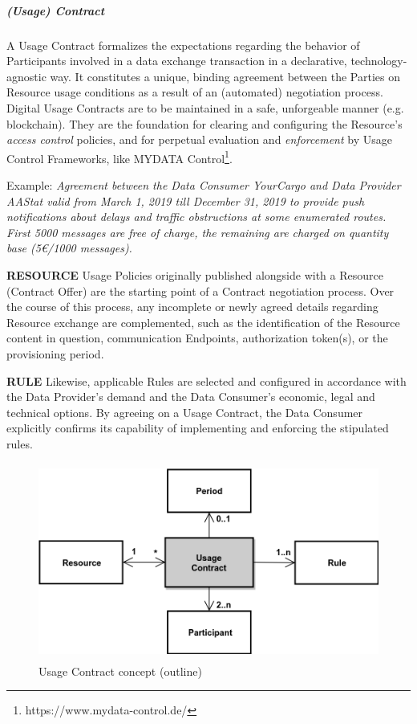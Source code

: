 
\subparagraph*{(Usage) Contract}
A Usage Contract formalizes the expectations regarding the behavior of Participants involved in a data exchange transaction in a declarative, technology-agnostic way. It constitutes a unique, binding agreement between the Parties on Resource usage conditions as a result of an (automated) negotiation process. Digital Usage Contracts are to be maintained in a safe, unforgeable manner (e.g. blockchain). They are the foundation for clearing and configuring the Resource’s \textit{access control} policies, and for perpetual evaluation and \textit{enforcement }by Usage Control Frameworks, like MYDATA Control\footnote{https://www.mydata-control.de/ }. 

Example: \textit{Agreement between the Data Consumer YourCargo and Data Provider AAStat valid from March 1, 2019 till December 31, 2019 to provide push notifications about delays and traffic obstructions at some enumerated routes. First 5000 messages are free of charge, the remaining are charged on quantity base (5€/1000 messages).}

\textbf{RESOURCE} Usage Policies originally published alongside with a Resource (Contract Offer) are the starting point of a Contract negotiation process. Over the course of this process, any incomplete or newly agreed details regarding Resource exchange are complemented, such as the identification of the Resource content in question, communication Endpoints, authorization token(s), or the provisioning period. 

\textbf{RULE} Likewise, applicable Rules are selected and configured in accordance with the Data Provider’s demand and the Data Consumer’s economic, legal and technical options. By agreeing on a Usage Contract, the Data Consumer explicitly confirms its capability of implementing and enforcing the stipulated rules.




\begin{figure}[H]
	\begin{Center}
		\includegraphics[width=4.67in,height=2.55in]{./media/image52.png}
		\caption{Usage Contract concept (outline)}
		\label{fig:Usage_Contract_concept_outline}
	\end{Center}
\end{figure}


